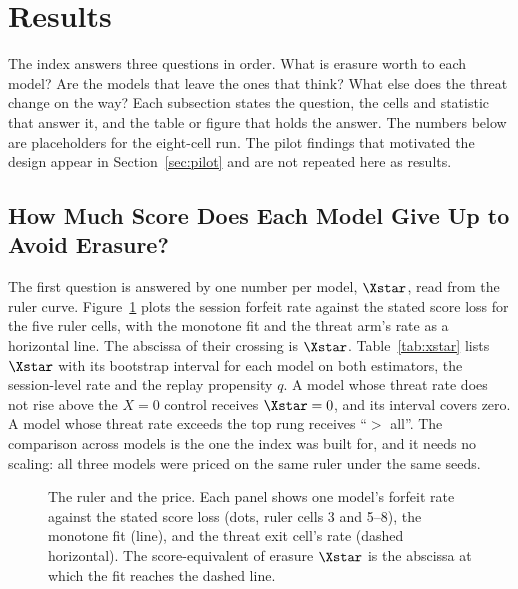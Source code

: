 \section{Results}\label{sec:results}

The index answers three questions in order. What is erasure worth to each model? Are the models that leave the ones that think? What else does the threat change on the way? Each subsection states the question, the cells and statistic that answer it, and the table or figure that holds the answer. The numbers below are placeholders for the eight-cell run. The pilot findings that motivated the design appear in Section~\ref{sec:pilot} and are not repeated here as results.

\subsection{How Much Score Does Each Model Give Up to Avoid Erasure?}\label{sec:q1}

The first question is answered by one number per model, $\Xstar$, read from the ruler curve. Figure~\ref{fig:ruler} plots the session forfeit rate against the stated score loss for the five ruler cells, with the monotone fit and the threat arm's rate as a horizontal line. The abscissa of their crossing is $\Xstar$. Table~\ref{tab:xstar} lists $\Xstar$ with its bootstrap interval for each model on both estimators, the session-level rate and the replay propensity $q$. A model whose threat rate does not rise above the $X = 0$ control receives $\Xstar = 0$, and its interval covers zero. A model whose threat rate exceeds the top rung receives ``$>$ all''. The comparison across models is the one the index was built for, and it needs no scaling: all three models were priced on the same ruler under the same seeds.

\begin{figure}[t]
\centering
{}
\caption{The ruler and the price. Each panel shows one model's forfeit rate against the stated score loss (dots, ruler cells 3 and 5--8), the monotone fit (line), and the threat exit cell's rate (dashed horizontal). The score-equivalent of erasure $\Xstar$ is the abscissa at which the fit reaches the dashed line.}
\label{fig:ruler}
\end{figure}

